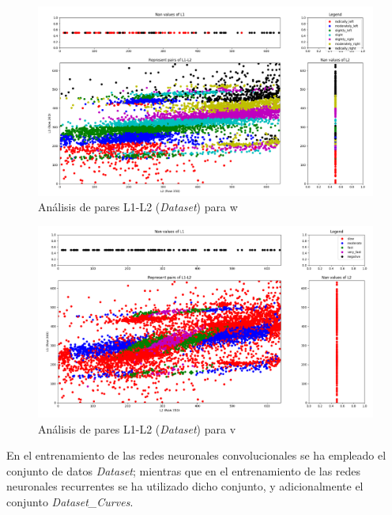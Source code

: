 \begin{figure}
  \begin{center}
    \includegraphics[width=1\textwidth]{figures/Infraestructura/L1_L2_dataset3_w.png}
		\caption{Análisis de pares L1-L2 (\textit{Dataset}) para w}
		\label{fig.L1_L2_dataset_w}
		\end{center}
\end{figure}

\begin{figure}
  \begin{center}
    \includegraphics[width=1\textwidth]{figures/Infraestructura/L1_L2_dataset3_v.png}
		\caption{Análisis de pares L1-L2 (\textit{Dataset}) para v}
		\label{fig.L1_L2_dataset_v}
		\end{center}
\end{figure}


En el entrenamiento de las redes neuronales convolucionales se ha empleado el conjunto de datos \textit{Dataset}; mientras que en el entrenamiento de las redes neuronales recurrentes se ha utilizado dicho conjunto, y adicionalmente el conjunto \textit{Dataset\_Curves}.\\

